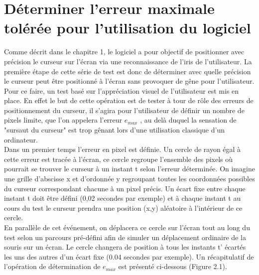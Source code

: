 \documentclass[a4paper, 12pt]{report}
\begin{document}
    	\section{Déterminer l'erreur maximale tolérée pour l'utilisation du logiciel}
        	Comme décrit dans le chapitre 1, le logiciel a pour objectif de positionner avec précision le curseur sur l'écran via une reconnaissance de l'iris de l'utilisateur. La première étape de cette série de test est donc de déterminer avec quelle précision le curseur peut être positionné à l'écran sans provoquer de gêne pour l'utilisateur.\\
Pour ce faire, un test basé sur l'appréciation visuel de l'utilisateur est mis en place. En effet le but de cette opération est de tester à tour de rôle des erreurs de positionnement du curseur, il s'agira pour l'utilisateur de définir un nombre de pixels limite, que l'on appelera l'erreur $e_{max}$ , au delà duquel la sensation de "sursaut du curseur" est trop gênant lors d'une utilisation classique d'un ordinateur.\\
Dans un premier temps l'erreur en pixel est définie. Un cercle de rayon égal à cette erreur est tracée à l'écran, ce cercle regroupe l'ensemble des pixels où pourrait se trouver le curseur à un instant t selon l'erreur déterminée. On imagine une grille d'abscisse x et d'ordonnée y regroupant toutes les coordonnées possibles du curseur correspondant chacune à un pixel précis. Un écart fixe entre chaque instant t doit être défini (0,02 secondes par exemple) et à chaque instant t au cours du test le curseur prendra une position (x,y) aléatoire à l'intérieur de ce cercle.\\
En parallèle de cet événement, on déplacera ce cercle sur l'écran tout au long du test selon un parcours pré-défini afin de simuler un déplacement ordinaire de la souris sur un écran. Le cercle changera de position à tous les instants t' écartés les uns des autres d'un écart fixe (0.04 secondes par exemple). Un récapitulatif de l'opération de détermination de $e_{max}$ est présenté ci-dessous (Figure 2.1).
\end{document}
